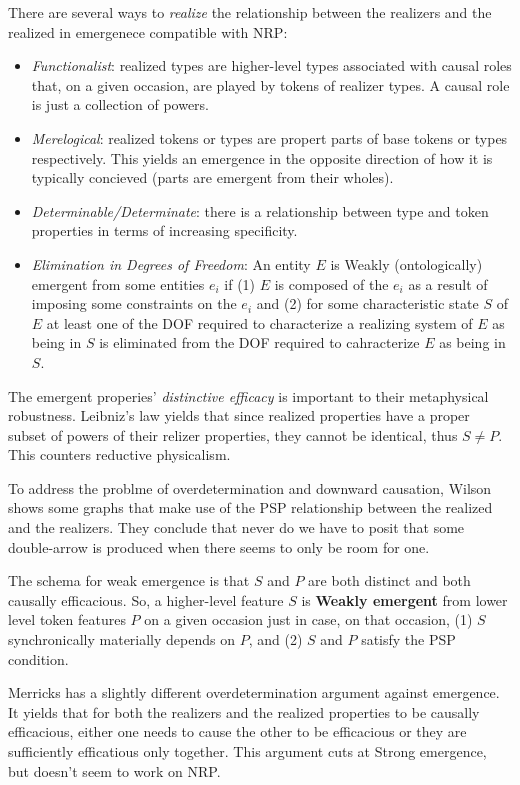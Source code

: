 \documentclass{article}
\newcommand{\ti}[1]{\textit{#1}}
\newcommand{\tb}[1]{\textbf{#1}}
\begin{document}
There are several ways to \ti{realize} the relationship between the realizers and the realized in emergenece compatible with NRP:

\begin{itemize}
    \item \ti{Functionalist}: realized types are higher-level types associated with causal roles that, on a given occasion, are played by tokens of realizer types. A causal role is just a collection of powers.
    \item \ti{Merelogical}: realized tokens or types are propert parts of base tokens or types respectively. This yields an emergence in the opposite direction of how it is typically concieved (parts are emergent from their wholes).
    \item \ti{Determinable/Determinate}: there is a relationship between type and token properties in terms of increasing specificity.
    \item \ti{Elimination in Degrees of Freedom}: An entity $E$ is Weakly (ontologically) emergent from some entities $e_i$ if (1) $E$ is composed of the $e_i$ as a result of imposing some constraints on the $e_i$ and (2) for some characteristic state $S$ of $E$ at least one of the DOF required to characterize a realizing system of $E$ as being in $S$ is eliminated from the DOF required to cahracterize $E$ as being in $S$.
\end{itemize}

The emergent properies' \ti{distinctive efficacy} is important to their metaphysical robustness. Leibniz's law yields that since realized properties have a proper subset of powers of their relizer properties, they cannot be identical, thus $S \neq P$. This counters reductive physicalism.

To address the problme of overdetermination and downward causation, Wilson shows some graphs that make use of the PSP relationship between the realized and the realizers. They conclude that never do we have to posit that some double-arrow is produced when there seems to only be room for one.

The schema for weak emergence is that $S$ and $P$ are both distinct and both causally efficacious. So, a higher-level feature $S$ is \tb{Weakly emergent} from lower level token features $P$ on a given occasion just in case, on that occasion, (1) $S$ synchronically materially depends on $P$, and (2) $S$ and $P$ satisfy the PSP condition.

Merricks has a slightly different overdetermination argument against emergence. It yields that for both the realizers and the realized properties to be causally efficacious, either one needs to cause the other to be efficacious or they are sufficiently efficatious only together. This argument cuts at Strong emergence, but doesn't seem to work on NRP.
\end{document}
